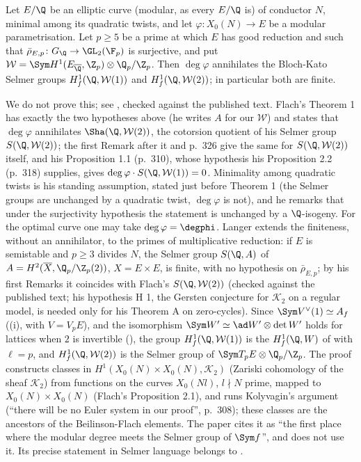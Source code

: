 \begin{theorem}[Flach]\label{thm:lfunctions:flach}
Let $E/\Q$ be an elliptic curve (modular, as every $E/\Q$ is) of conductor $N$, minimal among its quadratic twists, and let $\varphi\colon X_0(N)\to E$ be a modular
parametrisation. Let $p\ge5$ be a prime at which $E$ has good reduction and such that $\bar\rho_{E,p}\colon G_\Q\to\GL_2(\F_p)$ is surjective, and put
$\mathcal W=\Sym H^1(E_{\overline\Q},\Z_p)\otimes\Q_p/\Z_p$. Then $\deg\varphi$ annihilates the Bloch-Kato Selmer groups $H^1_f(\Q,\mathcal W(1))$ and $H^1_f(\Q,\mathcal W(2))$; in
particular both are finite.
\end{theorem}

We do not prove this; see \cite[Theorem 1 and the Remarks after it, p.~308; Propositions 1.1 and 2.2]{Flach92}, checked against the published text. Flach's Theorem 1 has
exactly the two hypotheses above (he writes $A$ for our $\mathcal W$) and states that $\deg\varphi$ annihilates $\Sha(\Q,\mathcal W(2))$, the cotorsion quotient of his Selmer
group $S(\Q,\mathcal W(2))$; the first Remark after it and p.~326 give the same for $S(\Q,\mathcal W(2))$ itself, and his Proposition 1.1 (p.~310), whose hypothesis his Proposition 2.2
(p.~318) supplies, gives $\deg\varphi\cdot S(\Q,\mathcal W(1))=0$. Minimality among quadratic twists is his standing assumption, stated just before Theorem 1 (the Selmer groups
are unchanged by a quadratic twist, $\deg\varphi$ is not), and he remarks that under the surjectivity hypothesis the statement is unchanged by a $\Q$-isogeny. For the optimal
curve one may take $\deg\varphi=\degphi$. Langer \cite[Theorem B]{Langer97} extends the finiteness, without an annihilator, to the primes of multiplicative reduction: if $E$ is semistable and $p\ge3$ divides $N$, the
Selmer group $S(\Q,A)$ of $A=H^2(\overline X,\Q_p/\Z_p(2))$, $X=E\times E$, is finite, with no hypothesis on $\bar\rho_{E,p}$; by his first Remarks it coincides with Flach's
$S(\Q,\mathcal W(2))$ (checked against the published text; his hypothesis H 1, the Gersten conjecture for $\mathcal K_2$ on a regular model, is needed only for his
Theorem A on zero-cycles). Since
$\Sym V^\vee(1)\simeq A_f$ ((i), with $V=V_pE$), and the isomorphism $\Sym W'\simeq\ad W'\otimes\det W'$ holds for lattices when $2$ is
invertible (), the group $H^1_f(\Q,\mathcal W(1))$ is the $H^1_f(\Q,W)$ of  with $\ell=p$, and $H^1_f(\Q,\mathcal W(2))$ is the
Selmer group of $\Sym T_pE\otimes\Q_p/\Z_p$. The proof constructs classes in $H^1(X_0(N)\times X_0(N),\mathcal K_2)$ (Zariski cohomology of the sheaf $\mathcal K_2$) from functions on the
curves $X_0(Nl)$, $l\nmid N$ prime, mapped to $X_0(N)\times X_0(N)$ (Flach's Proposition 2.1), and runs Kolyvagin's argument (``there will be no Euler system in our proof'',
p.~308); these classes are the ancestors of the Beilinson-Flach elements. The paper cites it as ``the first place where the modular degree meets
the Selmer group of $\Sym f$'', and does not use it. Its precise statement in Selmer language belongs to .


